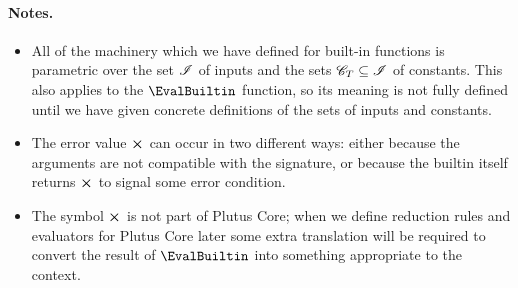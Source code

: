 \paragraph{Notes.}
\begin{itemize}
  \item All of the machinery which we have defined for built-in functions is
    parametric over the set $\mathscr{I}$ of inputs and the sets $\mathscr{C}_{T} \subseteq
    \mathscr{I}$ of constants. This also applies to the $\EvalBuiltin$ function, so its
    meaning is not fully defined until we have given concrete definitions of the
    sets of inputs and constants.
  \item The error value $\errorX$ can occur in two different ways: either
    because the arguments are not compatible with the signature, or because the
    builtin itself returns $\errorX$ to signal some error condition.
\item The symbol $\errorX$ is not part of Plutus Core; when we define reduction
  rules and evaluators for Plutus Core later some extra translation will be
  required to convert the result of $\EvalBuiltin$ into something appropriate to the
  context.
\end{itemize}


